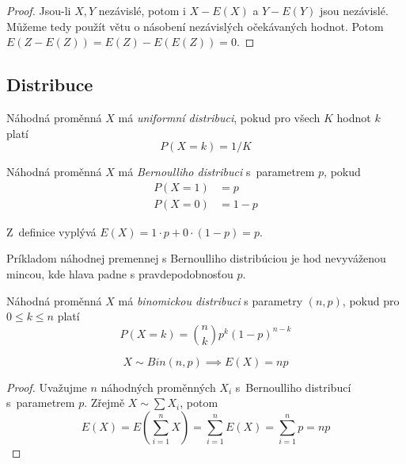 {\begin{proof}
    Jsou-li $X, Y$ nezávislé, potom i $X - E(X)$ a $Y - E(Y)$ jsou
    nezávislé. Můžeme tedy použít větu o násobení nezávislých
    očekávaných hodnot. Potom $E(Z - E(Z)) = E(Z) - E(E(Z)) = 0$.
\end{proof}

\subsection{Distribuce}

\begin{definition}
    Náhodná proměnná $X$ má {\em uniformní distribuci},
    pokud pro všech $K$ hodnot $k$ platí
    \[
        P(X = k) = 1/K
    \]
\end{definition}

\begin{definition}
    Náhodná proměnná $X$ má {\em Bernoulliho distribuci} s~parametrem
    $p$, pokud
    \begin{align*}
        P(X = 1) &= p  \\
        P(X = 0) &= 1 - p
    \end{align*}
\end{definition}

Z~definice vyplývá $E(X) = 1 \cdot p + 0 \cdot (1-p) = p$.

\begin{example}
    Príkladom náhodnej premennej s Bernoulliho distribúciou
	je hod nevyváženou mincou, kde hlava padne s pravdepodobnosťou $p$.
\end{example}

\begin{definition}
    Náhodná proměnná $X$ má {\em binomickou distribuci} s parametry $(n, p)$,
    pokud pro $0 \leq k \leq n$ platí
\[
    P(X = k) = {{n} \choose {k}} p^k (1 - p)^{n - k}
\]
\end{definition}

\begin{theorem}
    \[
        X \sim Bin(n,p) \implies E(X) = np
    \]
\end{theorem}

\begin{proof}
    Uvažujme $n$ náhodných proměnných $X_i$ s~Bernoulliho distribucí
    s~parametrem $p$.
    Zřejmě $X \sim \sum X_i$, potom
    \[
        E(X) = E( \sum_{i = 1}^{n} X )
             = \sum_{i = 1}^{n} E(X)
             = \sum_{i = 1}^{n} p
             = n p
    \]
\end{proof}

}
